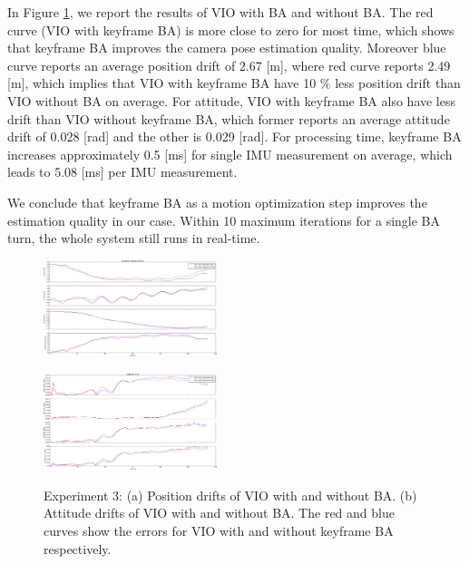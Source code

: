 In Figure \ref{fig:fig5-4}, we report the results of VIO with BA and without BA. The red curve (VIO with keyframe BA) is more close to zero for most time, which shows that keyframe BA improves the camera pose estimation quality. Moreover blue curve reports an average position drift of 2.67 [m], where red curve reports 2.49 [m], which implies that VIO with keyframe BA have 10 \% less position drift than VIO without BA on average. For attitude, VIO with keyframe BA also have less drift than VIO without keyframe BA, which former reports an average attitude drift of 0.028 [rad] and the other is 0.029 [rad]. For processing time, keyframe BA increases approximately 0.5 [ms] for single IMU measurement on average, which leads to 5.08 [ms] per IMU measurement. 

We conclude that keyframe BA as a motion optimization step improves the estimation quality in our case. Within 10 maximum iterations for a single BA turn, the whole system still runs in real-time. 

\begin{figure}
\centering
	\begin{subfloat}[]{
		\includegraphics[width=0.45\textwidth]{CONTENT/Figure/figure5_4_a.png}
		\label{fig:fig5-4-a}}
	\end{subfloat}\qquad
	\begin{subfloat}[]{
		\includegraphics[width=0.45\textwidth]{CONTENT/Figure/figure5_4_b.png}
		\label{fig:fig5-4-b}}
	\end{subfloat}
	
	
	\caption{Experiment 3: (a) Position drifts of VIO with and without BA. (b) Attitude drifts of VIO with and without BA. The red and blue curves show the errors for VIO with and without keyframe BA respectively.} 
	\label{fig:fig5-4}
\end{figure}

